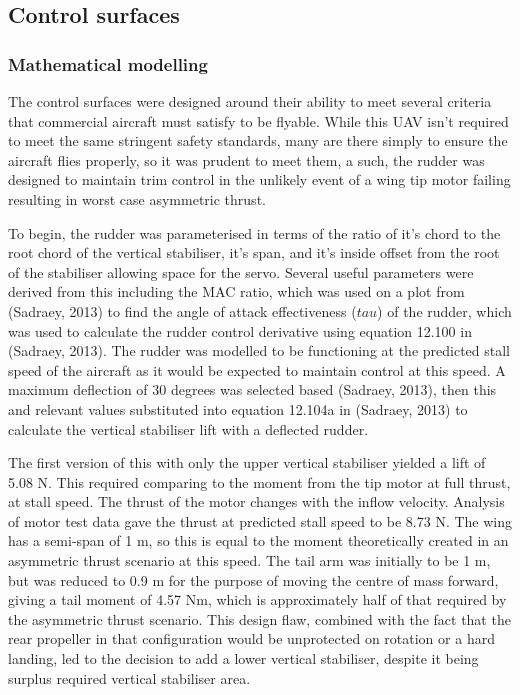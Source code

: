 \documentclass[../../main.tex]{subfiles}
\begin{document}

\subsection{Control surfaces} \label{sec:design-process:final-design-proposal:control-surfaces}

\subsubsection{Mathematical modelling} \label{sec:design-process:final-design-proposal:control-surfaces:mathematical-modelling}

The control surfaces were designed around their ability to meet several criteria that commercial aircraft must satisfy to be flyable. While this UAV isn’t required to meet the same stringent safety standards, many are there simply to ensure the aircraft flies properly, so it was prudent to meet them, a such, the rudder was designed to maintain trim control in the unlikely event of a wing tip motor failing resulting in worst case asymmetric thrust.  

To begin, the rudder was parameterised in terms of the ratio of it’s chord to the root chord of the vertical stabiliser, it’s span, and it’s inside offset from the root of the stabiliser allowing space for the servo.
Several useful parameters were derived from this including the MAC ratio, which was used on a plot from (Sadraey, 2013) to find the angle of attack effectiveness ($tau$) of the rudder, which was used to calculate the rudder control derivative using equation 12.100 in (Sadraey, 2013).
The rudder was modelled to be functioning at the predicted stall speed of the aircraft as it would be expected to maintain control at this speed.
A maximum deflection of 30 degrees was selected based (Sadraey, 2013), then this and relevant values substituted into equation 12.104a in (Sadraey, 2013) to calculate the vertical stabiliser lift with a deflected rudder. 

The first version of this with only the upper vertical stabiliser yielded a lift of 5.08 N.
This required comparing to the moment from the tip motor at full thrust, at stall speed.
The thrust of the motor changes with the inflow velocity.
Analysis of motor test data gave the thrust at predicted stall speed to be 8.73 N.
The wing has a semi-span of 1 m, so this is equal to the moment theoretically created in an asymmetric thrust scenario at this speed.
The tail arm was initially to be 1 m, but was reduced to 0.9 m for the purpose of moving the centre of mass forward, giving a tail moment of 4.57 Nm, which is approximately half of that required by the asymmetric thrust scenario.
This design flaw, combined with the fact that the rear propeller in that configuration would be unprotected on rotation or a hard landing, led to the decision to add a lower vertical stabiliser, despite it being surplus required vertical stabiliser area. 
\end{document}
